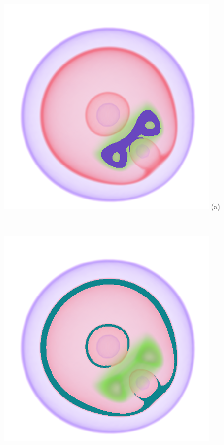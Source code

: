 \documentclass[twoside,twocolumn,10pt]{article}
\begin{document}
\begin{figure}
	\centering
	\begin{minipage}{.2\textwidth}
		\centering
		\includegraphics[width=1\linewidth]{crop/nucleon_segment_green}
(a)
	\end{minipage}~
	\begin{minipage}{.2\textwidth}
		\centering
		\includegraphics[width=1\linewidth]{crop/nucleon_segment_red}

\end{minipage}
\end{figure}
\end{document}
